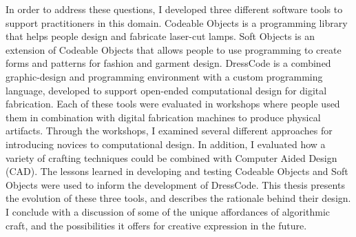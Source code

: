 In order to address these questions,  I developed three different software tools to support practitioners in this domain. Codeable Objects is a programming library that helps people design and fabricate laser-cut lamps. Soft Objects is an extension of Codeable Objects that allows people to use programming to create forms and patterns for fashion and garment design. DressCode is a combined graphic-design and programming environment with a custom programming language, developed to support open-ended computational design for digital fabrication. Each of these tools were evaluated in workshops where people used them in combination with digital fabrication machines to produce physical artifacts. Through the workshops, I examined several different approaches for introducing novices to computational design. In addition, I evaluated how a variety of crafting techniques could be combined with Computer Aided Design (CAD). The lessons learned in developing and testing Codeable Objects and Soft Objects were used to inform the development of DressCode. This thesis presents the evolution of these three tools, and describes the rationale behind their design. I conclude with a discussion of some of the unique affordances of algorithmic craft, and the possibilities it offers for creative expression in the future.  